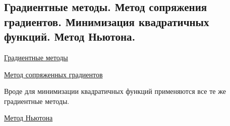 \subsection{Градиентные методы. Метод сопряжения градиентов. Минимизация квадратичных функций. Метод Ньютона.}

\href{https://ru.wikipedia.org/wiki/%D0%93%D1%80%D0%B0%D0%B4%D0%B8%D0%B5%D0%BD%D1%82%D0%BD%D1%8B%D0%B5_%D0%BC%D0%B5%D1%82%D0%BE%D0%B4%D1%8B}{Градиентные методы}

\href{http://www.machinelearning.ru/wiki/index.php?title=%D0%9C%D0%B5%D1%82%D0%BE%D0%B4_%D1%81%D0%BE%D0%BF%D1%80%D1%8F%D0%B6%D1%91%D0%BD%D0%BD%D1%8B%D1%85_%D0%B3%D1%80%D0%B0%D0%B4%D0%B8%D0%B5%D0%BD%D1%82%D0%BE%D0%B2}{Метод сопряженных градиентов}

Вроде для минимизации квадратичных функций применяются все те же градиентные методы.

\href{https://ru.wikipedia.org/wiki/%D0%9C%D0%B5%D1%82%D0%BE%D0%B4_%D0%9D%D1%8C%D1%8E%D1%82%D0%BE%D0%BD%D0%B0}{Метод Ньютона}

